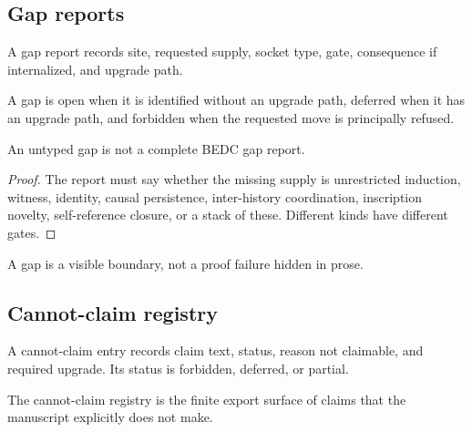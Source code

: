 \subsection{Gap reports}
\label{subsec:philosophy-gap-report-discipline}

\begin{definition}
\label{def:philosophy-gap-report-discipline}
A gap report records site, requested supply, socket type, gate,
consequence if internalized, and upgrade path.
\end{definition}

\begin{definition}
\label{def:philosophy-gap-status}
A gap is open when it is identified without an upgrade path, deferred
when it has an upgrade path, and forbidden when the requested move is
principally refused.
\end{definition}

\begin{theorem}
\label{thm:philosophy-gaps-must-be-typed}
An untyped gap is not a complete BEDC gap report.
\end{theorem}
\begin{proof}
The report must say whether the missing supply is unrestricted
induction, witness, identity, causal persistence, inter-history
coordination, inscription novelty, self-reference closure, or a stack
of these. Different kinds have different gates.
\end{proof}

\begin{corollary}
\label{cor:philosophy-gaps-positive-honesty}
A gap is a visible boundary, not a proof failure hidden in prose.
\end{corollary}

\subsection{Cannot-claim registry}
\label{subsec:philosophy-cannot-claim-discipline}

\begin{definition}
\label{def:philosophy-cannot-claim-entry-discipline}
A cannot-claim entry records claim text, status, reason not claimable,
and required upgrade. Its status is forbidden, deferred, or partial.
\end{definition}

\begin{definition}
\label{def:philosophy-cannot-claim-registry}
The cannot-claim registry is the finite export surface of claims that
the manuscript explicitly does not make.
\end{definition}

